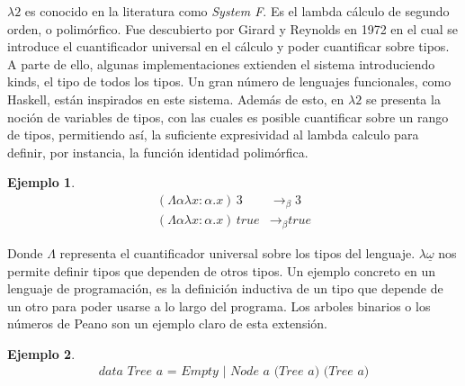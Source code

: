 \documentclass[a4paper,12pt]{report}
\theoremstyle{definition}
\newtheorem{example}{Ejemplo}[chapter]
\theoremstyle{plain}
\theoremstyle{remark}
\begin{document}
$\lambda2$ es conocido en la literatura como \textit{System F}. Es el lambda cálculo de segundo orden, o polimórfico. Fue descubierto por Girard y Reynolds en 1972 en el cual se introduce el cuantificador universal en el cálculo y poder cuantificar sobre tipos. A parte de ello, algunas implementaciones extienden el sistema introduciendo kinds, el tipo de todos los tipos. Un gran número de lenguajes funcionales, como Haskell, están inspirados en este sistema. Además de esto, en $\lambda2$ se presenta la noción de variables de tipos, con las cuales es posible cuantificar sobre un rango de tipos, permitiendo así, la suficiente expresividad al lambda calculo para definir, por instancia, la función identidad polimórfica.

\begin{example}
\begin{align*}
(\Lambda\alpha \lambda x : \alpha . x)\,3  &\longrightarrow_\beta 3 \\
(\Lambda\alpha \lambda x : \alpha . x)\,\textit{true} &\longrightarrow_\beta \textit{true}
\end{align*}
\end{example}
Donde $\Lambda$ representa el cuantificador universal sobre los tipos del lenguaje.
\newline
\newline
$\lambda\underline{\omega}$ nos permite definir tipos que dependen de otros tipos. Un ejemplo concreto en un lenguaje de programación, es la definición inductiva de un tipo que depende de un otro para poder usarse a lo largo del programa. Los arboles binarios o los números de Peano son un ejemplo claro de esta extensión.
\begin{example}
  \begin{align*}
    \textit{data Tree a = Empty | Node a (Tree a) (Tree a)}
\end{align*}
\end{example}
\medskip
\end{document}

